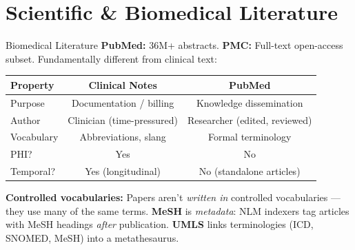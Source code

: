 \documentclass[aspectratio=169,11pt]{beamer}
\begin{document}
\section{Scientific \& Biomedical Literature}

\begin{frame}{Biomedical Literature}
\small
\textbf{PubMed:} 36M+ abstracts. \textbf{PMC:} Full-text open-access subset. Fundamentally different from clinical text:

\vspace{0.05em}
\begin{center}
\scriptsize
\begin{tabular}{lcc}
\toprule
\textbf{Property} & \textbf{Clinical Notes} & \textbf{PubMed} \\
\midrule
Purpose & Documentation / billing & Knowledge dissemination \\
Author & Clinician (time-pressured) & Researcher (edited, reviewed) \\
Vocabulary & Abbreviations, slang & Formal terminology \\
PHI? & Yes & No \\
Temporal? & Yes (longitudinal) & No (standalone articles) \\
\bottomrule
\end{tabular}
\end{center}

\pause
\vspace{0.05em}
\textbf{Controlled vocabularies:} Papers aren't \emph{written in} controlled vocabularies --- they use many of the same terms. \textbf{MeSH} is \emph{metadata}: NLM indexers tag articles with MeSH headings \emph{after} publication. \textbf{UMLS} links terminologies (ICD, SNOMED, MeSH) into a metathesaurus.
\end{frame}
\end{document}
